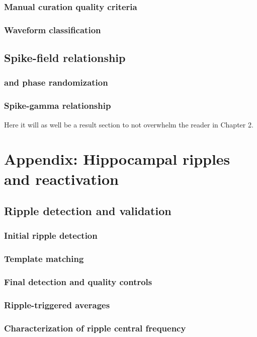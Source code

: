 \documentclass[12pt,a4paper]{report}
\newcommand{\gs}[1]{\glsentryshort{#1}}  %
\begin{document}
\subsection{Manual curation quality criteria}
\subsection{Waveform classification}

\section{Spike-field relationship}
\label{apdx:spike-field}
\subsection{\gs{ppc} and phase randomization}
\subsection{Spike-gamma relationship}
\label{apdx:spike2Gamma}
Here it will as well be a result section to not overwhelm the reader in Chapter 2.

\chapter{Appendix: Hippocampal ripples and reactivation}

\section{Ripple detection and validation}
\subsection{Initial ripple detection}
\subsection{Template matching}
\subsection{Final detection and quality controls}
\subsection{Ripple-triggered averages}
\subsection{Characterization of ripple central frequency}
\end{document}

